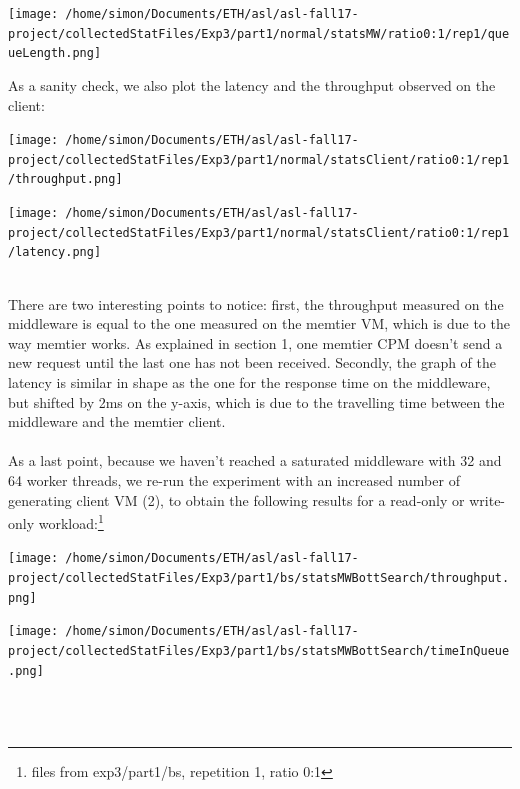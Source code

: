 \documentclass[11pt,a4paper]{article}
\begin{document}
\begin{center}
\texttt{[image: /home/simon/Documents/ETH/asl/asl-fall17-project/collectedStatFiles/Exp3/part1/normal/statsMW/ratio0:1/rep1/queueLength.png]}
\end{center}
As a sanity check, we also plot the latency and the throughput observed on the client:
\\
\begin{minipage}{0.5\linewidth}
\texttt{[image: /home/simon/Documents/ETH/asl/asl-fall17-project/collectedStatFiles/Exp3/part1/normal/statsClient/ratio0:1/rep1/throughput.png]}
\end{minipage}
\hfill
\begin{minipage}{0.5\linewidth}
\texttt{[image: /home/simon/Documents/ETH/asl/asl-fall17-project/collectedStatFiles/Exp3/part1/normal/statsClient/ratio0:1/rep1/latency.png]}
\end{minipage}
\\
There are two interesting points to notice: first, the throughput measured on the middleware is equal to the one measured on the memtier VM, which is due to the way memtier works. As explained in section 1, one memtier CPM doesn't send a new request until the last one has not been received. Secondly, the graph of the latency is similar in shape as the one for the response time on the middleware, but shifted by 2ms on the y-axis, which is due to the travelling time between the middleware and the memtier client. 
\\
\\
As a last point, because we haven't reached a saturated middleware with 32 and 64 worker threads, we re-run the experiment with an increased number of generating client VM (2), to obtain the following results for a read-only or write-only workload:\footnote{files from exp3/part1/bs, repetition 1, ratio 0:1}
\\
\begin{minipage}{0.48\linewidth}
\texttt{[image: /home/simon/Documents/ETH/asl/asl-fall17-project/collectedStatFiles/Exp3/part1/bs/statsMWBottSearch/throughput.png]}
\end{minipage}
\hfill
\begin{minipage}{0.48\linewidth}
\texttt{[image: /home/simon/Documents/ETH/asl/asl-fall17-project/collectedStatFiles/Exp3/part1/bs/statsMWBottSearch/timeInQueue.png]}
\end{minipage}
\\\\
\end{document}
